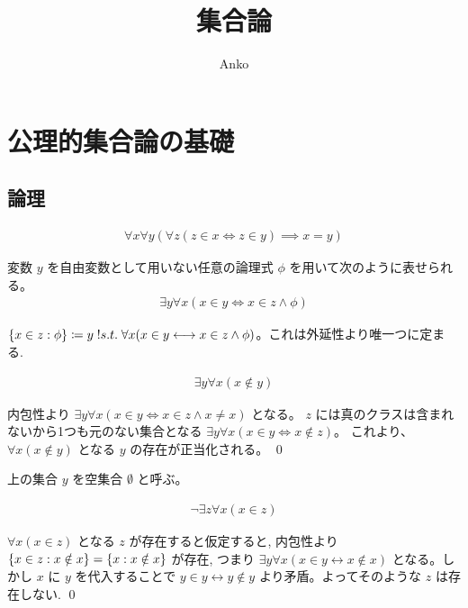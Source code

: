 \documentclass[uplatex,dvipdfmx,a4paper,11pt]{jlreq}
\title{集合論}
\author{Anko}
\makeatletter
\theoremstyle{definition}
\renewenvironment{proof}[1][\proofname]{\par
  \normalfont
  \topsep6\p@\@plus6\p@ \trivlist
  \item[\hskip\labelsep{\bfseries #1}\@addpunct{\bfseries}]\ignorespaces\quad\par
}{%
  \qed\endtrivlist\@endpefalse
}
\renewcommand\proofname{証明}
\makeatother
\begin{document}
\maketitle
\tableofcontents
\clearpage

\section{公理的集合論の基礎}
\subsection{論理}
\begin{axiom}[外延性]
  \begin{align}
    \forall x\forall y(\forall z(z\in x\iff z\in y)\implies x=y)
  \end{align}
\end{axiom}
\begin{axiom}[内包性図式]
  変数 $y$ を自由変数として用いない任意の論理式 $\phi$ を用いて次のように表せられる。
  \begin{align}
    \exists y\forall x(x\in y\iff x\in z\land \phi)
  \end{align}
\end{axiom}

\begin{definition}[内包性図式]
  $\qty{x\in z:\phi}\coloneq y \thickspace\text!{s.t.}\thickspace \forall x(x\in y\longleftrightarrow x\in z\land \phi)$。これは外延性より唯一つに定まる.
\end{definition}

\begin{theorem}
  \begin{align}
    \exists y\forall x(x\notin y)
  \end{align}
\end{theorem}
\begin{proof}
  内包性より $\exists y\forall x(x\in y\iff x\in z\land x\neq x)$ となる。
  $z$ には真のクラスは含まれないから1つも元のない集合となる $\exists y\forall x(x\in y\iff x\notin z)$。
  これより、$\forall x(x\notin y)$ となる $y$ の存在が正当化される。
\end{proof}

\begin{definition}
  上の集合 $y$ を空集合 $\emptyset$ と呼ぶ。
\end{definition}

\begin{theorem}
  \begin{align}
    \lnot\exists z\forall x(x\in z)
  \end{align}
\end{theorem}
\begin{proof}
  $\forall x(x\in z)$ となる $z$ が存在すると仮定すると, 内包性より $\qty{x\in z: x\notin x} = \qty{x: x\notin x}$ が存在, つまり $\exists y\forall x(x\in y\longleftrightarrow x\notin x)$ となる。しかし $x$ に $y$ を代入することで $y\in y\longleftrightarrow y\notin y$ より矛盾。よってそのような $z$ は存在しない.
\end{proof}
\end{document}
